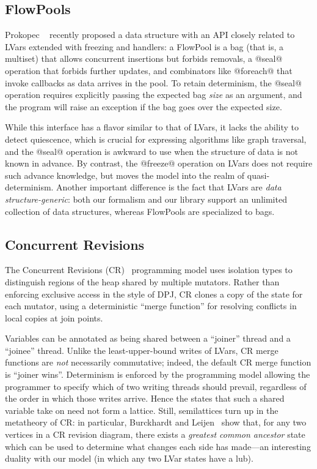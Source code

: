 \documentclass{article}
\begin{document}
\subsection{FlowPools}

Prokopec \etal~\cite{flowpools} recently proposed a data structure
with an API closely related to LVars extended with freezing and
handlers: a FlowPool is a bag (that is, a multiset) that allows
concurrent insertions but forbids removals, a @seal@ operation that
forbids further updates, and combinators like @foreach@ that invoke
callbacks as data arrives in the pool.  To retain determinism, the
@seal@ operation requires explicitly passing the expected bag
\emph{size} as an argument, and the program will raise an exception if
the bag goes over the expected size.

While this interface has a flavor similar to that of LVars, it lacks
the ability to detect quiescence, which is crucial for expressing
algorithms like graph traversal, and the @seal@ operation is awkward
to use when the structure of data is not known in advance.  By
contrast, the @freeze@ operation on LVars does not require such
advance knowledge, but moves the model into the realm of
quasi-determinism.  Another important difference is the fact that
LVars are \emph{data structure-generic}: both our formalism and our
library support an unlimited collection of data structures, whereas
FlowPools are specialized to bags.

\subsection{Concurrent Revisions}

The Concurrent Revisions (CR)~\cite{concurrent-revisions-haskell11}
programming model uses isolation types to distinguish regions of the
heap shared by multiple mutators.  Rather than enforcing exclusive
access in the style of DPJ, CR clones a copy of the state for each
mutator, using a deterministic ``merge function'' for resolving
conflicts in local copies at join points.

Variables can be annotated as being shared between a ``joiner'' thread
and a ``joinee'' thread.  Unlike the least-upper-bound writes of
LVars, CR merge functions are \emph{not} necessarily commutative;
indeed, the default CR merge function is ``joiner wins''.  Determinism
is enforced by the programming model allowing the programmer to
specify which of two writing threads should prevail, regardless of the
order in which those writes arrive.  Hence the states that such a
shared variable take on need not form a lattice.  Still, semilattices
turn up in the metatheory of CR: in particular, Burckhardt and
Leijen~\cite{semantics-concurrent-revisions} show that, for any two
vertices in a CR revision diagram, there exists a \emph{greatest
  common ancestor} state which can be used to determine what changes
each side has made---an interesting duality with our model (in which
any two LVar states have a lub).
\end{document}
